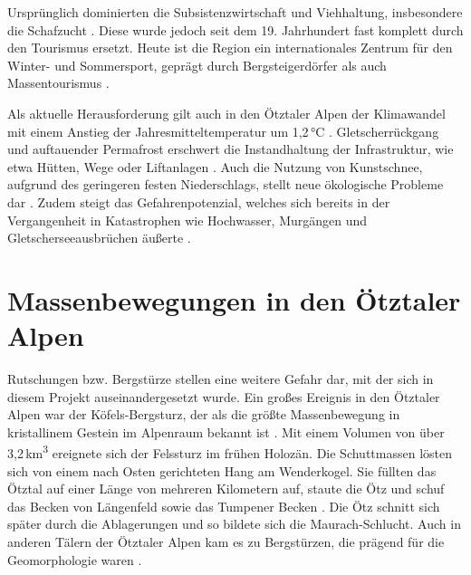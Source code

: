 \documentclass[../main.tex]{subfiles}
\begin{document}
Ursprünglich dominierten die Subsistenzwirtschaft und Viehhaltung, insbesondere die Schafzucht \autocite{stottenLockinsCommunityResilience2021, geistUpperOtzValley2022}. Diese wurde jedoch seit dem 19. Jahrhundert fast komplett durch den Tourismus ersetzt. Heute ist die Region ein internationales Zentrum für den Winter- und Sommersport, geprägt durch Bergsteigerdörfer als auch Massentourismus \autocite{stottenLockinsCommunityResilience2021, geistUpperOtzValley2022, aulitzkyMountainHazardGeomorphology1994, fischerGlaciersSnowSki2011, bachnetzerBachnetzerTourismusentwicklungIm2013}.

Als aktuelle Herausforderung gilt auch in den Ötztaler Alpen der Klimawandel mit einem Anstieg der Jahresmitteltemperatur um 1,2\,°C \autocite{stottenLockinsCommunityResilience2021, geistUpperOtzValley2022, fischerGlaciersSnowSki2011}. Gletscherrückgang und auftauender Permafrost erschwert die Instandhaltung der Infrastruktur, wie etwa Hütten, Wege oder Liftanlagen \autocite{stottenLockinsCommunityResilience2021, abadMassMovementSusceptibility2022, geistUpperOtzValley2022, fischerGlaciersSnowSki2011}. Auch die Nutzung von Kunstschnee, aufgrund des geringeren festen Niederschlags, stellt neue ökologische Probleme dar \autocite{stottenLockinsCommunityResilience2021, geistUpperOtzValley2022}. Zudem steigt das Gefahrenpotenzial, welches sich bereits in der Vergangenheit in Katastrophen wie Hochwasser, Murgängen und Gletscherseeausbrüchen äußerte \autocite{abadMassMovementSusceptibility2022, geistUpperOtzValley2022, aulitzkyMountainHazardGeomorphology1994}.

\section{Massenbewegungen in den Ötztaler Alpen}

Rutschungen bzw. Bergstürze stellen eine weitere Gefahr dar, mit der sich in diesem Projekt auseinandergesetzt wurde. Ein großes Ereignis in den Ötztaler Alpen war der Köfels-Bergsturz, der als die größte Massenbewegung in kristallinem Gestein im Alpenraum bekannt ist \autocite{hermannsExamplesMultipleRockslope2006, pragerGeologicalControlsSlope2009}. Mit einem Volumen von über 3,2\,km\textsuperscript{3} ereignete sich der Felssturz im frühen Holozän. Die Schuttmassen lösten sich von einem nach Osten gerichteten Hang am Wenderkogel. Sie füllten das Ötztal auf einer Länge von mehreren Kilometern auf, staute die Ötz und schuf das Becken von Längenfeld sowie das Tumpener Becken \autocite{pragerGeologicalControlsSlope2009}. Die Ötz schnitt sich später durch die Ablagerungen und so bildete sich die Maurach-Schlucht. Auch in anderen Tälern der Ötztaler Alpen kam es zu Bergstürzen, die prägend für die Geomorphologie waren \autocite{hermannsExamplesMultipleRockslope2006, pragerGeologicalControlsSlope2009}.
\end{document}
